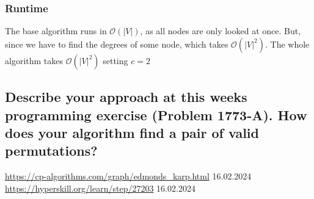 \documentclass[runningheads]{llncs}
\begin{document}
\subsubsection*{Runtime} The base algorithm runs in $\mathcal{O}(|V|)$, as all nodes are only looked at once. But, since we have to find the degrees of some node, which takes $\mathcal{O}(|V|^2)$. The whole algorithm takes $\mathcal{O}(|V|^2)$ setting $c = 2$

\subsection*{Describe your approach at this weeks programming exercise (Problem 1773-A). How does your algorithm find a pair of valid permutations?}

\begin{thebibliography}{8}
     \url{https://cp-algorithms.com/graph/edmonds\_karp.html} 16.02.2024
     \url{https://hyperskill.org/learn/step/27203} 16.02.2024

\end{thebibliography}
\end{document}
